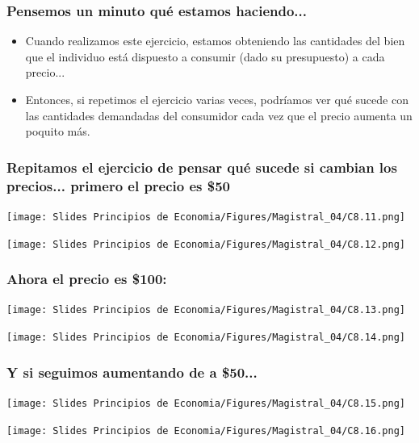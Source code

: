 \documentclass{beamer}
\begin{document}
\begin{frame}
\frametitle{Pensemos un minuto qué estamos haciendo...}
\begin{itemize}
    \item Cuando realizamos este ejercicio, estamos obteniendo las cantidades del bien que el individuo está dispuesto a consumir (dado su presupuesto) a cada precio... \vspace{2mm}
    \item Entonces, si repetimos el ejercicio varias veces, podríamos ver qué sucede con las cantidades demandadas del consumidor cada vez que el precio aumenta un poquito más.
\end{itemize}
\end{frame}

\begin{frame}
\frametitle{Repitamos el ejercicio de pensar qué sucede si cambian los precios... primero el precio es \$50}
\begin{center}
  \begin{minipage}{0.48\textwidth}
      \texttt{[image: Slides Principios de Economia/Figures/Magistral\_04/C8.11.png]}
  \end{minipage}\hfill
  \begin{minipage}{0.48\textwidth}
      \texttt{[image: Slides Principios de Economia/Figures/Magistral\_04/C8.12.png]}
  \end{minipage}
\end{center}
\end{frame}

\begin{frame}
\frametitle{Ahora el precio es \$100:}
\begin{center}
  \begin{minipage}{0.48\textwidth}
      \texttt{[image: Slides Principios de Economia/Figures/Magistral\_04/C8.13.png]}
  \end{minipage}\hfill
  \begin{minipage}{0.48\textwidth}
      \texttt{[image: Slides Principios de Economia/Figures/Magistral\_04/C8.14.png]}
  \end{minipage}
\end{center}
\end{frame}


\begin{frame}
\frametitle{Y si seguimos aumentando de a \$50...}
\begin{center}
  \begin{minipage}{0.48\textwidth}
      \texttt{[image: Slides Principios de Economia/Figures/Magistral\_04/C8.15.png]}
  \end{minipage}\hfill
  \begin{minipage}{0.48\textwidth}
      \texttt{[image: Slides Principios de Economia/Figures/Magistral\_04/C8.16.png]}
  \end{minipage}
\end{center}
\end{frame}
\end{document}
